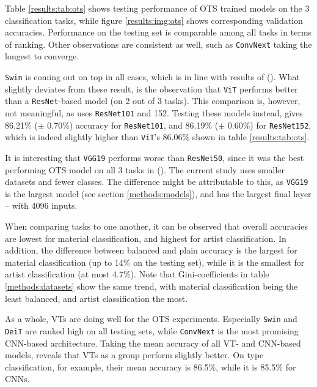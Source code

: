 Table \ref{results:tab:ots} shows testing performance of OTS trained models on the 3 classification tasks, while figure \ref{results:img:ots} shows corresponding validation accuracies. Performance on the testing set is comparable among all tasks in terms of ranking. Other observations are consistent as well, such as \texttt{ConvNext} taking the longest to converge.

\texttt{Swin} is coming out on top in all cases, which is in line with results of \citeauthor{zhou2021convnets} (\citeyear{zhou2021convnets}). What slightly deviates from these result, is the observation that \texttt{ViT} performs better than a \texttt{ResNet}-based model (on 2 out of 3 tasks). This comparison is, however, not meaningful, as \citeauthor{zhou2021convnets} uses \texttt{ResNet101} and 152. Testing these models instead, gives 86.21\% ($\pm$ 0.70\%) accuracy for \texttt{ResNet101}, and 86.19\% ($\pm$ 0.60\%) for \texttt{ResNet152}, which is indeed slightly higher than \texttt{ViT}'s 86.06\% shown in table \ref{results:tab:ots}.

It is interesting that \texttt{VGG19} performs worse than \texttt{ResNet50}, since it was the best performing OTS model on all 3 tasks in \citeauthor{sabatelli2018deep} (\citeyear{sabatelli2018deep}). The current study uses smaller datasets and fewer classes. The difference might be attributable to this, as \texttt{VGG19} is the largest model (see section \ref{methods:models}), and has the largest final layer -- with 4096 inputs.

When comparing tasks to one another, it can be observed that overall accuracies are lowest for material classification, and highest for artist classification. In addition, the difference between balanced and plain accuracy is the largest for material classification (up to 14\% on the testing set), while it is the smallest for artist classification (at most 4.7\%). Note that Gini-coefficients in table \ref{methods:datasets} show the same trend, with material classification being the least balanced, and artist classification the most.

As a whole, VTs are doing well for the OTS experiments. Especially \texttt{Swin} and \texttt{DeiT} are ranked high on all testing sets, while \texttt{ConvNext} is the most promising CNN-based architecture. Taking the mean accuracy of all VT- and CNN-based models, reveals that VTs as a group perform slightly better. On type classification, for example, their mean accuracy is 86.5\%, while it is 85.5\% for CNNs.

